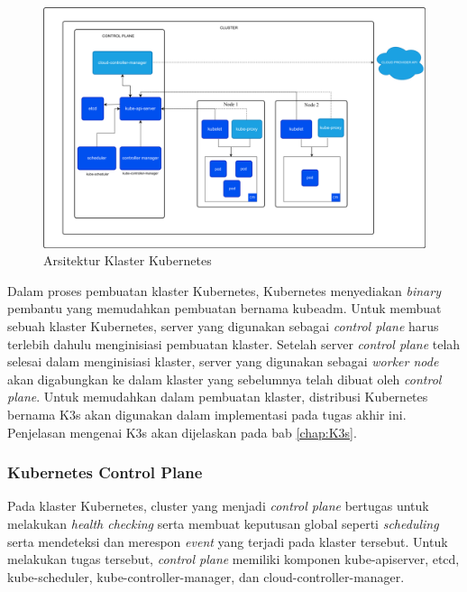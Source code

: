 \begin{figure}[H]
  \centering
  \includegraphics[scale=0.15]{gambar/kubernetes-cluster-architecture.png}
  \caption{Arsitektur Klaster Kubernetes}
  \label{fig:arsitektur-cluster-kubernetes}
\end{figure}

Dalam proses pembuatan klaster Kubernetes, Kubernetes menyediakan \emph{binary} pembantu
yang memudahkan pembuatan bernama kubeadm. Untuk membuat sebuah klaster Kubernetes,
server yang digunakan sebagai \emph{control plane} harus terlebih dahulu menginisiasi
pembuatan klaster. Setelah server \emph{control plane} telah selesai dalam menginisiasi klaster,
server yang digunakan sebagai \emph{worker node} akan digabungkan ke dalam klaster yang sebelumnya
telah dibuat oleh \emph{control plane}. Untuk memudahkan dalam pembuatan klaster, distribusi
Kubernetes bernama K3s akan digunakan dalam implementasi pada tugas akhir ini. Penjelasan
mengenai K3s akan dijelaskan pada bab \ref{chap:K3s}.

\subsubsection{Kubernetes Control Plane}

Pada klaster Kubernetes, cluster yang menjadi \emph{control plane} bertugas
untuk melakukan \emph{health checking} serta membuat keputusan global seperti \emph{scheduling}
serta mendeteksi dan merespon \emph{event} yang terjadi pada klaster tersebut. Untuk melakukan
tugas tersebut, \emph{control plane} memiliki komponen kube-apiserver,
etcd, kube-scheduler, kube-controller-manager, dan cloud-controller-manager.

